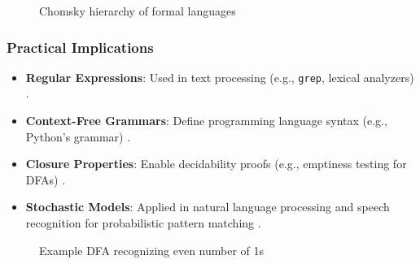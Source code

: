 \begin{figure} [h]
    \centering
    \caption{Chomsky hierarchy of formal languages}
    \label{fig:chomsky-hierarchy}
\end{figure}


\subsubsection{Practical Implications}
\begin{itemize}
    \item \textbf{Regular Expressions}: Used in text processing (e.g., \texttt{grep}, lexical analyzers) \cite{kernighan1984unix, hopcroft2006introduction}.  
    \item \textbf{Context-Free Grammars}: Define programming language syntax (e.g., Python’s grammar) \cite{chomsky1956three, hopcroft2006introduction}.  
    \item \textbf{Closure Properties}: Enable decidability proofs (e.g., emptiness testing for DFAs) \cite{hopcroft2006introduction}.  
    \item \textbf{Stochastic Models}: Applied in natural language processing and speech recognition for probabilistic pattern matching \cite{rabin1963probabilistic}.  
\end{itemize}

\begin{figure}[h]
    \centering
    \caption{Example DFA recognizing even number of 1s}
    \label{fig:dfa-example}
\end{figure}
\newpage